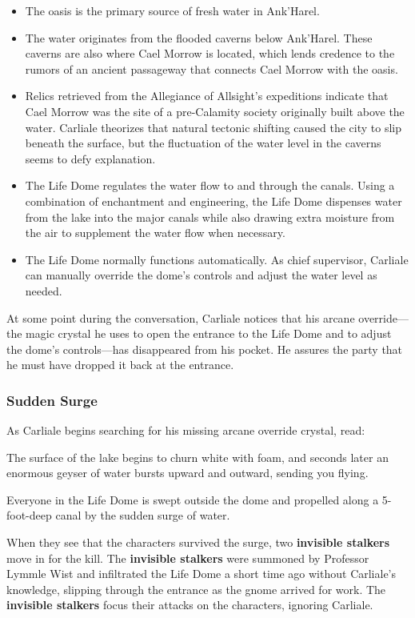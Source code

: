 \documentclass[letterpaper, 11pt, bg=full, twocolumn]{dndbook}
\begin{document}
\begin{itemize}
\item The oasis is the primary source of fresh water in Ank'Harel.
\item The water originates from the flooded caverns below Ank'Harel. These caverns are also where Cael Morrow is located, which lends credence to the rumors of an ancient passageway that connects Cael Morrow with the oasis.
\item Relics retrieved from the Allegiance of Allsight's expeditions indicate that Cael Morrow was the site of a pre-Calamity society originally built above the water. Carliale theorizes that natural tectonic shifting caused the city to slip beneath the surface, but the fluctuation of the water level in the caverns seems to defy explanation.
\item The Life Dome regulates the water flow to and through the canals. Using a combination of enchantment and engineering, the Life Dome dispenses water from the lake into the major canals while also drawing extra moisture from the air to supplement the water flow when necessary.
\item The Life Dome normally functions automatically. As chief supervisor, Carliale can manually override the dome's controls and adjust the water level as needed.
\end{itemize}

At some point during the conversation, Carliale notices that his arcane override---the magic crystal he uses to open the entrance to the Life Dome and to adjust the dome's controls---has disappeared from his pocket. He assures the party that he must have dropped it back at the entrance.

\subsubsection{Sudden Surge}

As Carliale begins searching for his missing arcane override crystal, read:

\begin{DndReadAloud}
The surface of the lake begins to churn white with foam, and seconds later an enormous geyser of water bursts upward and outward, sending you flying.
\end{DndReadAloud}

Everyone in the Life Dome is swept outside the dome and propelled along a 5-foot-deep canal by the sudden surge of water.

When they see that the characters survived the surge, two \textbf{invisible stalkers} move in for the kill. The \textbf{invisible stalkers} were summoned by Professor Lymmle Wist and infiltrated the Life Dome a short time ago without Carliale's knowledge, slipping through the entrance as the gnome arrived for work. The \textbf{invisible stalkers} focus their attacks on the characters, ignoring Carliale.
\end{document}
